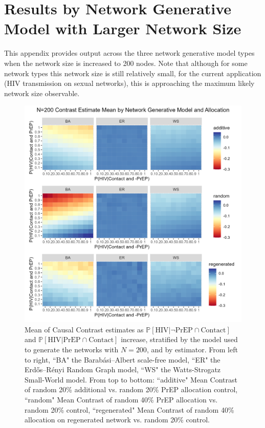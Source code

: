 \documentclass{article}
\theoremstyle{definition}
\begin{document}
\newpage
\section{Results by Network Generative Model with Larger Network Size}
\label{sec: E}
This appendix provides output across the three network generative model types when the network size is increased to 200 nodes. Note that although for some network types this network size is still relatively small, for the current application (HIV transmission on sexual networks), this is approaching the maximum likely network size observable.
\begin{figure}[H]
    \centering
    \includegraphics[width=\linewidth]{Figures/Large N Generative Model Mean plots.png}
    \caption{Mean of Causal Contrast estimates as $\mathbb{P}\left[\text{HIV} \vert \neg \text{PrEP} \cap \text{Contact}\right]$ and $\mathbb{P}\left[\text{HIV} \vert \text{PrEP} \cap \text{Contact}\right]$ increase, stratified by the model used to generate the networks with $N=200$, and by estimator. From left to right, ``BA" the Barabási–Albert scale-free model, ``ER" the Erdős–Rényi Random Graph model, ``WS" the Watts-Strogatz Small-World model. From top to bottom: ``additive" Mean Contrast of random 20\% additional vs. random 20\% PrEP allocation control, ``random" Mean Contrast of random 40\% PrEP allocation vs. random 20\% control, ``regenerated" Mean Contrast of random 40\% allocation on regenerated network vs. random 20\% control.}
    \label{fig:E1}
\end{figure}
\end{document}
